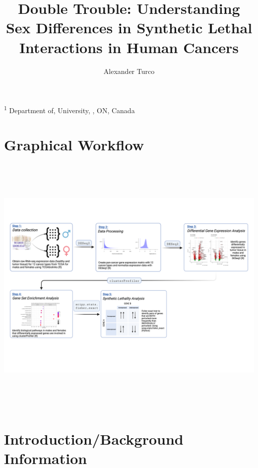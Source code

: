 \documentclass[10pt]{article}
\title{\sc Double Trouble: Understanding Sex Differences in Synthetic Lethal Interactions in Human Cancers}
\author{\sc Alexander Turco}
\begin{document}

\onecolumn
                        \maketitle

\thispagestyle{empty}
\noindent \textsuperscript{1} Department of, University, , ON, Canada

\newpage
\tableofcontents %
\newpage
       
\section{Graphical Workflow} 

\begin{center}
	\includegraphics[width=\textwidth, height=13cm]{project_workflow_slpmcrc.png}
\end{center}

\newpage
\section{Introduction/Background Information}
\end{document}
